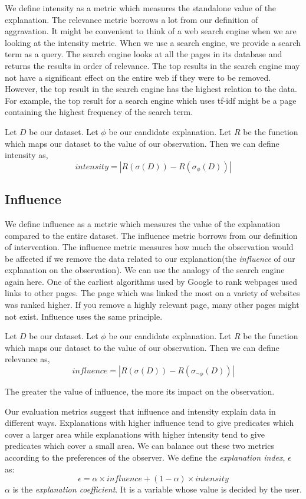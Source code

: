 We define intensity as a metric which measures the standalone value of the explanation. The relevance metric borrows a lot from our definition of aggravation. It might be convenient to think of a web search engine when we are looking at the intensity metric. When we use a search engine, we provide a search term as a query. The search engine looks at all the pages in its database and returns the results in order of relevance. The top results in the search engine may not have a significant effect on the entire web if they were to be removed. However, the top result in the search engine has the highest relation to the data. For example, the top result for a search engine which uses tf-idf might be a page containing the highest frequency of the search term\citep{robertson2004understanding}.

Let $D$ be our dataset. Let $\phi$ be our candidate explanation. Let $R$ be the function which maps our dataset to the value of our observation. Then we can define intensity as,
$$intensity = |R(\sigma (D)) - R(\sigma_\phi (D))|$$

\subsection{Influence}
\label{sec:influence}
We define influence as a metric which measures the value of the explanation compared to the entire dataset. The influence metric borrows from our definition of intervention. The influence metric measures how much the observation would be affected if we remove the data related to our explanation(the \textit{influence} of our explanation on the observation). We can use the analogy of the search engine again here. One of the earliest algorithms used by Google to rank webpages used links to other pages\citep{brin1998anatomy}. The page which was linked the most on a variety of websites was ranked higher. If you remove a highly relevant page, many other pages might not exist. Influence uses the same principle.

Let $D$ be our dataset. Let $\phi$ be our candidate explanation. Let $R$ be the function which maps our dataset to the value of our observation. Then we can define relevance as,
$$influence = |R(\sigma(D)) - R(\sigma_{\neg \phi} (D)) |$$

The greater the value of influence, the more its impact on the observation.

Our evaluation metrics suggest that influence and intensity explain data in different ways. Explanations with higher influence tend to give predicates which cover a larger area while explanations with higher intensity tend to give predicates which cover a small area. We can balance out these two metrics according to the preferences of the observer. We define the \textit{explanation index}, $\epsilon$ as:
$$\epsilon = \alpha \times influence + (1-\alpha) \times intensity$$
$\alpha$ is the \textit{explanation coefficient}. It is a variable whose value is decided by the user.

